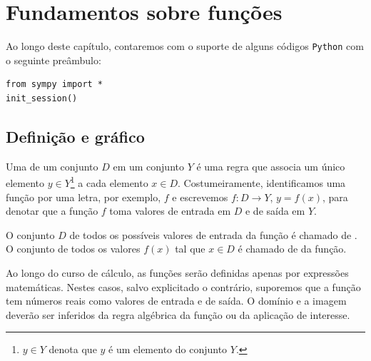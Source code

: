 
\chapter{Fundamentos sobre funções}\label{cap_funcao}
\thispagestyle{fancy}

\ifispython
Ao longo deste capítulo, contaremos com o suporte de alguns códigos \verb+Python+ com o seguinte preâmbulo:
\begin{verbatim}
from sympy import *
init_session()
\end{verbatim}
\fi

\section{Definição e gráfico}\label{cap_funcao_sec_defgrafico}

Uma  de um conjunto $D$ em um conjunto $Y$ é uma regra que associa um único elemento $y\in Y$\footnote{$y\in Y$ denota que $y$ é um elemento do conjunto $Y$.} a cada elemento $x\in D$. Costumeiramente, identificamos uma função por uma letra, por exemplo, $f$ e escrevemos $f:D\to Y$, $y=f(x)$, para denotar que a função $f$ toma valores de entrada em $D$ e de saída em $Y$.

O conjunto $D$ de todos os possíveis valores de entrada da função é chamado de . O conjunto de todos os valores $f(x)$ tal que $x\in D$ é chamado de  da função.

Ao longo do curso de cálculo, as funções serão definidas apenas por expressões matemáticas. Nestes casos, salvo explicitado o contrário, suporemos que a função tem números reais como valores de entrada e de saída. O domínio e a imagem deverão ser inferidos da regra algébrica da função ou da aplicação de interesse.

